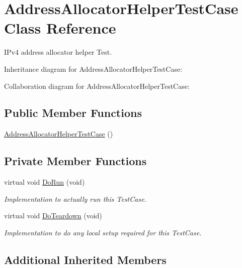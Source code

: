 \hypertarget{classAddressAllocatorHelperTestCase}{}\section{Address\+Allocator\+Helper\+Test\+Case Class Reference}
\label{classAddressAllocatorHelperTestCase}


I\+Pv4 address allocator helper Test.  




Inheritance diagram for Address\+Allocator\+Helper\+Test\+Case\+:


Collaboration diagram for Address\+Allocator\+Helper\+Test\+Case\+:
\subsection*{Public Member Functions}
\begin{DoxyCompactItemize}
\item 
\hyperlink{classAddressAllocatorHelperTestCase_a96968dfc5a8a1eac19ef07abd36c0591}{Address\+Allocator\+Helper\+Test\+Case} ()
\end{DoxyCompactItemize}
\subsection*{Private Member Functions}
\begin{DoxyCompactItemize}
\item 
virtual void \hyperlink{classAddressAllocatorHelperTestCase_a656de93866cbaa5b5c43799d84ca2a27}{Do\+Run} (void)
\begin{DoxyCompactList}\small\item\em Implementation to actually run this Test\+Case. \end{DoxyCompactList}\item 
virtual void \hyperlink{classAddressAllocatorHelperTestCase_a4e97fb60346508f005c2c36d696cc999}{Do\+Teardown} (void)
\begin{DoxyCompactList}\small\item\em Implementation to do any local setup required for this Test\+Case. \end{DoxyCompactList}\end{DoxyCompactItemize}
\subsection*{Additional Inherited Members}


